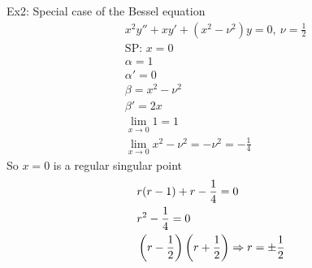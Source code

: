 \documentclass[11pt, fleqn]{article}
\begin{document}
Ex2: Special case of the Bessel equation
\begin{align*}
    &x^2y''+xy'+(x^2-\nu^2)y=0,\ \nu=\frac{1}{2}\\
    &\text{SP: }x=0\\
    &\alpha=1\\
    &\alpha'=0\\
    &\beta=x^2-\nu^2\\
    &\beta'=2x\\
    &\lim_{x\to0}1=1\\
    &\lim_{x\to0}x^2-\nu^2=-\nu^2=-\frac{1}{4}
\end{align*}
So $x=0$ is a regular singular point
\begin{align*}
    &r(r-1)+r-\frac{1}{4}=0\\
    &r^2-\frac{1}{4}=0\\
    &\left( r-\frac{1}{2} \right)\left( r+\frac{1}{2} \right)\Rightarrow r=\pm\frac{1}{2}
\end{align*}
\end{document}
